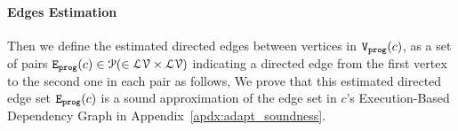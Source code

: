\paragraph*{Edges Estimation}
Then we define the estimated directed edges
between vertices in $\mathtt{{V_{prog}}}(c)$,
as a set of pairs 
$\mathtt{{E_{prog}}}(c) \in \mathcal{P}(\in \mathcal{LV} \times \mathcal{LV})$
indicating a directed edge from the first vertex to the second one in each pair
as follows,
We prove that this estimated directed edge set $\mathtt{{E_{prog}}}(c)$ is a sound approximation of the 
edge set in $c$'s Execution-Based Dependency Graph 
in Appendix~\ref{apdx:adapt_soundness}.
